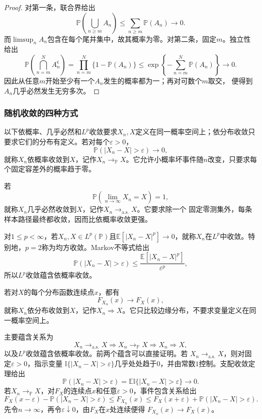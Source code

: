 \begin{proof}
对第一条，联合界给出
\[
  \mathbb{P}\left(\bigcup_{n\geq m}A_n\right)
  \leq\sum_{n\geq m}\mathbb{P}(A_n)\longrightarrow0.
\]
而\(\limsup_n A_n\)包含在每个尾并集中，故其概率为零。对第二条，固定\(m\)。独立性
给出
\[
  \mathbb{P}\left(\bigcap_{n=m}^{N}A_n^{\mathsf c}\right)
  =
  \prod_{n=m}^{N}\{1-\mathbb{P}(A_n)\}
  \leq
  \exp\left\{-\sum_{n=m}^{N}\mathbb{P}(A_n)\right\}
  \longrightarrow0.
\]
因此从任意\(m\)开始至少有一个\(A_n\)发生的概率都为一；再对可数个\(m\)取交，
便得到\(A_n\)几乎必然发生无穷多次。
\end{proof}

\subsubsection{随机收敛的四种方式}

\begin{definition}[随机变量的收敛]
  \label{def:probability-random-convergence}
以下依概率、几乎必然和\(L^p\)收敛要求\(X_n,X\)定义在同一概率空间上；依分布收敛只要求它们的分布有定义。若对每个\(\varepsilon>0\)，
\[ \mathbb{P}(|X_n-X|>\varepsilon)\to0, \]
就称\(X_n\)依概率收敛到\(X\)，记作\(X_n\to_{\mathbb{P}}X\)。它允许小概率坏事件随\(n\)改变，只要求每个固定容差外的概率趋于零。

若
\[ \mathbb{P}\left(
    \lim_{n\to\infty}X_n=X\right)=1, \]
就称\(X_n\)几乎必然收敛到\(X\)，记作\(X_n\to_{\mathrm{a.s.}}X\)。它要求除一个
固定零测集外，每条样本路径最终都收敛，因而比依概率收敛更强。

对\(1\leq p<\infty\)，若\(X_n,X\in L^p(\mathbb P)\)且\(\mathbb{E}[|X_n-X|^p]\to0\)，就称\(X_n\)在\(L^p\)中收敛。特别地，\(p=2\)称为均方收敛。Markov不等式给出
\[ \mathbb{P}(|X_n-X|>\varepsilon)
  \leq\frac{\mathbb{E}[|X_n-X|^p]}{\varepsilon^p}, \]
所以\(L^p\)收敛蕴含依概率收敛。

若对\(X\)的每个分布函数连续点\(x\)，都有
\[ F_{X_n}(x)\to F_X(x), \]
就称\(X_n\)依分布收敛到\(X\)，记作\(X_n\Rightarrow X\)。它只比较边缘分布，不要求变量定义在同一概率空间上。

\end{definition}
主要蕴含关系为
\[ X_n\to_{\mathrm{a.s.}}X
  \Longrightarrow X_n\to_{\mathbb{P}}X\Longrightarrow X_n\Rightarrow X, \]
以及\(L^p\)收敛蕴含依概率收敛。前两个蕴含可以直接证明。若
\(X_n\to_{\mathrm{a.s.}}X\)，则对固定\(\varepsilon>0\)，指示变量
\(\mathbb{I}\{|X_n-X|>\varepsilon\}\)几乎处处趋于\(0\)，并由常数\(1\)控制。支配收敛定理给出
\[
  \mathbb{P}(|X_n-X|>\varepsilon)
  =\mathbb{E}\mathbb{I}\{|X_n-X|>\varepsilon\}\to0.
\]
若\(X_n\to_{\mathbb{P}}X\)，对\(F_X\)的连续点\(x\)和任意\(\varepsilon>0\)，事件包含关系给出
\[
  F_X(x-\varepsilon)-\mathbb{P}(|X_n-X|>\varepsilon)
  \leq F_{X_n}(x)
  \leq
  F_X(x+\varepsilon)+\mathbb{P}(|X_n-X|>\varepsilon).
\]
先令\(n\to\infty\)，再令\(\varepsilon\downarrow0\)，由\(F_X\)在\(x\)处连续便得
\(F_{X_n}(x)\to F_X(x)\)。

